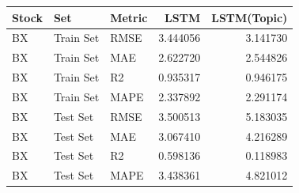 \begin{tabular}{lllrr}
\toprule
Stock & Set & Metric & LSTM & LSTM(Topic) \\
\midrule
BX & Train Set & RMSE & 3.444056 & 3.141730 \\
BX & Train Set & MAE & 2.622720 & 2.544826 \\
BX & Train Set & R2 & 0.935317 & 0.946175 \\
BX & Train Set & MAPE & 2.337892 & 2.291174 \\
BX & Test Set & RMSE & 3.500513 & 5.183035 \\
BX & Test Set & MAE & 3.067410 & 4.216289 \\
BX & Test Set & R2 & 0.598136 & 0.118983 \\
BX & Test Set & MAPE & 3.438361 & 4.821012 \\
\bottomrule
\end{tabular}
